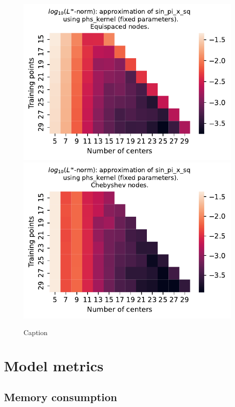\documentclass[12pt]{report} %
\begin{document}
\begin{figure}[ht]
  \centering

  \includegraphics[width=.49\textwidth]{imagenes/experiments/1d/least_squares/opt-sin_pi_x_sq-Kphs_kernel-Equi.pdf}
  \includegraphics[width=.49\textwidth]{imagenes/experiments/1d/least_squares/opt-sin_pi_x_sq-Kphs_kernel-Cheb.pdf}
  \caption{Caption}
  \label{fig:opt-sin-pi-x-sq-phs}
\end{figure}





\chapter*{Model metrics}

\section*{Memory consumption}
\end{document}
